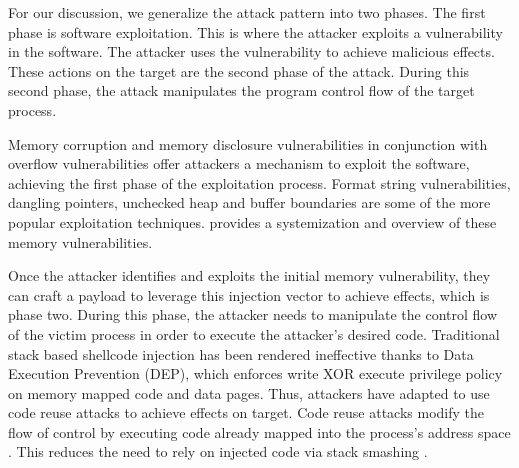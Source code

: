 \documentclass[preprint,12pt]{elsarticle}
\begin{document}
For our discussion, we generalize the attack pattern into two phases. The first phase is software exploitation. This is where the attacker exploits a vulnerability in the software. The attacker uses the vulnerability to achieve malicious effects. These actions on the target are the second phase of the attack. During this second phase, the attack manipulates the program control flow of the target process. 

Memory corruption and memory disclosure vulnerabilities in conjunction with overflow vulnerabilities offer attackers a mechanism to exploit the software, achieving the first phase of the exploitation process. Format string vulnerabilities, dangling pointers, unchecked heap and buffer boundaries are some of the more popular exploitation techniques. \cite{szekeres2013sok} provides a systemization and overview of these memory vulnerabilities.

Once the attacker identifies and exploits the initial memory vulnerability, they can craft a payload to leverage this injection vector to achieve effects, which is phase two. During this phase, the attacker needs to manipulate the control flow of the victim process in order to execute the attacker's desired code. Traditional stack based shellcode injection has been rendered ineffective thanks to Data Execution Prevention (DEP), which enforces write XOR execute privilege policy on memory mapped code and data pages. Thus, attackers have adapted to use code reuse attacks to achieve effects on target. Code reuse attacks modify the flow of control by executing code already mapped into the process's address space \cite{shacham2007geometry}. This reduces the need to rely on injected code via stack smashing \cite{aleph1996smashing}.
\end{document}
